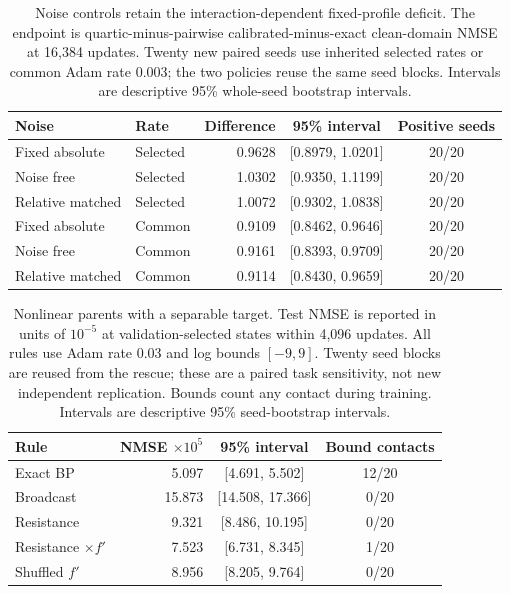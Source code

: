 \begin{table}[!htbp]
\centering
\small
\caption{Noise controls retain the interaction-dependent fixed-profile deficit. The endpoint is quartic-minus-pairwise calibrated-minus-exact clean-domain NMSE at 16,384 updates. Twenty new paired seeds use inherited selected rates or common Adam rate 0.003; the two policies reuse the same seed blocks. Intervals are descriptive 95\% whole-seed bootstrap intervals.}
\label{tab:noise_sensitivity}
\begin{tabular}{llrcc}
\toprule
Noise & Rate & Difference & 95\% interval & Positive seeds \\
\midrule
Fixed absolute & Selected & 0.9628 & [0.8979, 1.0201] & 20/20 \\
Noise free & Selected & 1.0302 & [0.9350, 1.1199] & 20/20 \\
Relative matched & Selected & 1.0072 & [0.9302, 1.0838] & 20/20 \\
Fixed absolute & Common & 0.9109 & [0.8462, 0.9646] & 20/20 \\
Noise free & Common & 0.9161 & [0.8393, 0.9709] & 20/20 \\
Relative matched & Common & 0.9114 & [0.8430, 0.9659] & 20/20 \\
\bottomrule
\end{tabular}
\end{table}
\begin{table}[!htbp]
\centering
\small
\caption{Nonlinear parents with a separable target. Test NMSE is reported in units of $10^{-5}$ at validation-selected states within 4,096 updates. All rules use Adam rate 0.03 and log bounds $[-9,9]$. Twenty seed blocks are reused from the rescue; these are a paired task sensitivity, not new independent replication. Bounds count any contact during training. Intervals are descriptive 95\% seed-bootstrap intervals.}
\label{tab:nonlinear_separable}
\begin{tabular}{lrcc}
\toprule
Rule & NMSE $\times10^5$ & 95\% interval & Bound contacts \\
\midrule
Exact BP & 5.097 & [4.691, 5.502] & 12/20 \\
Broadcast & 15.873 & [14.508, 17.366] & 0/20 \\
Resistance & 9.321 & [8.486, 10.195] & 0/20 \\
Resistance $\times f'$ & 7.523 & [6.731, 8.345] & 1/20 \\
Shuffled $f'$ & 8.956 & [8.205, 9.764] & 0/20 \\
\bottomrule
\end{tabular}
\end{table}
